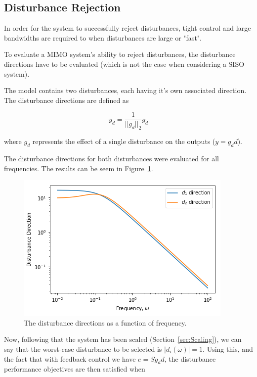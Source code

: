 \subsection{Disturbance Rejection}

In order for the system to successfully reject disturbances, tight control and large bandwidths are required to when disturbances are large or "fast". 

To evaluate a MIMO system's ability to reject disturbances, the disturbance directions have to be evaluated (which is not the case when considering a SISO system). 

The model contains two disturbances, each having it's own associated direction. The disturbance directions are defined as

\begin{equation}
	y_d = \frac{1}{||g_d||_2}g_d
\end{equation}

where $g_d$ represents the effect of a single disturbance on the outputs ($y = g_dd$).

The disturbance directions for both disturbances were evaluated for all frequencies. The results can be seem in Figure~\ref{fig:disturbance-direction}.

\begin{figure}[H]
	\centering
	\includegraphics[width=0.7\linewidth]{"Figures/Disturbance Direction"}
	\caption{The disturbance directions as a function of frequency.}
	\label{fig:disturbance-direction}
\end{figure}

Now, following that the system has been scaled (Section~\ref{sec:Scaling}), we can say that the worst-case disturbance to be selected is $|d_i(\omega)| = 1$. Using this, and the fact that with feedback control we have $e = Sg_dd$, the disturbance performance objectives are then satisfied when

